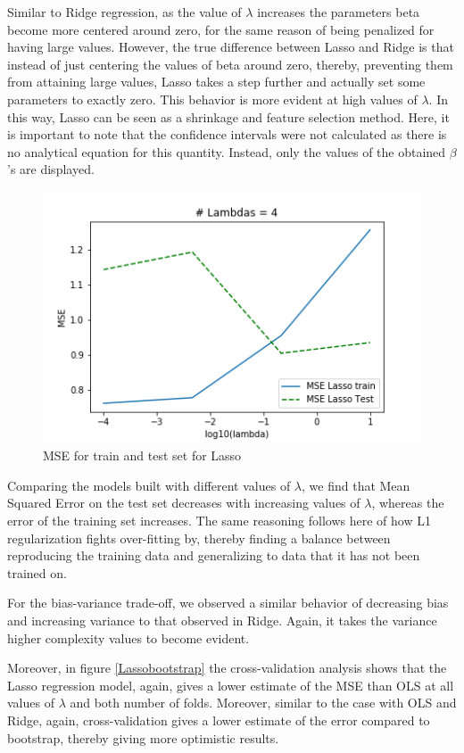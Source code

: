 \documentclass{article}
\begin{document}
Similar to Ridge regression, as the value of $\lambda$ increases the parameters beta become more centered around zero, for the same reason of being penalized for having large values. However, the true difference between Lasso and Ridge is that instead of just centering the values of beta around zero, thereby, preventing them from attaining large values, Lasso takes a step further and actually set some parameters to exactly zero. This behavior is more evident at high values of $\lambda$. In this way, Lasso can be seen as a shrinkage and feature selection method.
Here, it is important to note that the confidence intervals were not calculated as there is no analytical equation for this quantity. Instead, only the values of the obtained $\beta$'s are displayed.
\begin{figure}[h]
\includegraphics[scale=0.5]{Plots/lassoRegressionModelplot.png}
\centering
\caption{MSE for train and test set for Lasso}
\label{fig:lassoTrainTest}
\end{figure}
Comparing the models built with different values of $\lambda$, we find that Mean Squared Error on the test set decreases with increasing values of $\lambda$, whereas the error of the training set increases. The same reasoning follows here of how L1 regularization fights over-fitting by, thereby finding a balance between reproducing the training data and generalizing to data that it has not been trained on.

For the bias-variance trade-off, we observed a similar behavior of decreasing bias and increasing variance to that observed in Ridge. Again, it takes the variance higher complexity values to become evident.

Moreover, in figure \ref{Lassobootstrap} the cross-validation analysis shows that the Lasso regression model, again, gives a lower estimate of the MSE than OLS at all values of $\lambda$ and both number of folds. Moreover, similar to the case with OLS and Ridge, again, cross-validation gives a lower estimate of the error compared to bootstrap, thereby giving more optimistic results.
\end{document}

